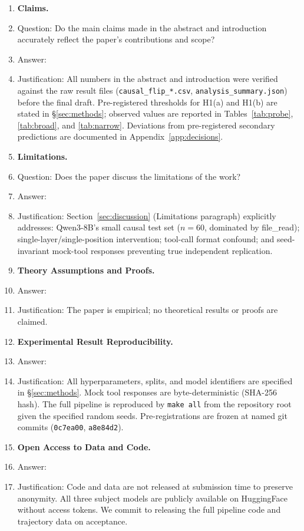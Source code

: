 \documentclass{article}
\begin{document}
\begin{enumerate}

\item \textbf{Claims.}
\item[] Question: Do the main claims made in the abstract and introduction
accurately reflect the paper's contributions and scope?
\item[] Answer: \answerYes{}
\item[] Justification: All numbers in the abstract and introduction
were verified against the raw result files (\texttt{causal\_flip\_*.csv},
\texttt{analysis\_summary.json}) before the final draft.
Pre-registered thresholds for H1(a) and H1(b) are stated in
\S\ref{sec:methods}; observed values are reported in
Tables~\ref{tab:probe}, \ref{tab:broad}, and \ref{tab:narrow}.
Deviations from pre-registered secondary predictions are documented
in Appendix~\ref{app:decisions}.

\item \textbf{Limitations.}
\item[] Question: Does the paper discuss the limitations of the work?
\item[] Answer: \answerYes{}
\item[] Justification: Section~\ref{sec:discussion} (Limitations
paragraph) explicitly addresses: Qwen3-8B's small causal test set
($n{=}60$, dominated by file\_read); single-layer/single-position
intervention; tool-call format confound; and seed-invariant mock-tool
responses preventing true independent replication.

\item \textbf{Theory Assumptions and Proofs.}
\item[] Answer: \answerNA{}
\item[] Justification: The paper is empirical; no theoretical results
or proofs are claimed.

\item \textbf{Experimental Result Reproducibility.}
\item[] Answer: \answerYes{}
\item[] Justification: All hyperparameters, splits, and model
identifiers are specified in \S\ref{sec:methods}.
Mock tool responses are byte-deterministic (SHA-256 hash).
The full pipeline is reproduced by \texttt{make all} from the
repository root given the specified random seeds.  Pre-registrations
are frozen at named git commits (\texttt{0c7ea00}, \texttt{a8e84d2}).

\item \textbf{Open Access to Data and Code.}
\item[] Answer: \answerNo{}
\item[] Justification: Code and data are not released at submission
time to preserve anonymity.  All three subject models are publicly
available on HuggingFace without access tokens.  We commit to
releasing the full pipeline code and trajectory data on acceptance.


\end{enumerate}
\end{document}
